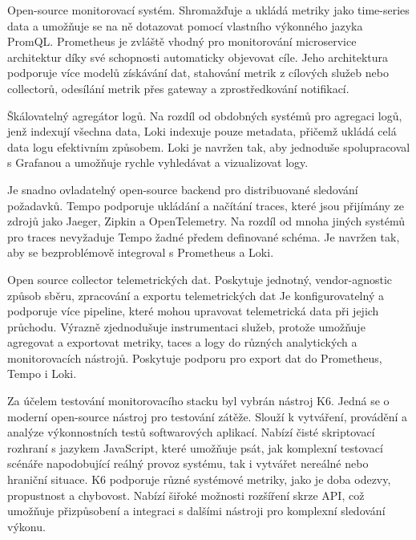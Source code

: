  
Open-source monitorovací systém. Shromažďuje a ukládá metriky jako time-series data a umožňuje se na ně dotazovat pomocí vlastního výkonného jazyka PromQL. Prometheus je zvláště vhodný pro monitorování microservice architektur díky své schopnosti automaticky objevovat cíle. Jeho architektura podporuje více modelů získávání dat, stahování metrik z cílových služeb nebo collectorů, odesílání metrik přes gateway a zprostředkování notifikací.


Škálovatelný agregátor logů. Na rozdíl od obdobných systémů pro agregaci logů, jenž indexují všechna data, Loki indexuje pouze metadata, přičemž ukládá celá data logu efektivním způsobem. Loki je navržen tak, aby jednoduše spolupracoval s Grafanou a umožňuje rychle vyhledávat a vizualizovat logy.


Je snadno ovladatelný open-source backend pro distribuované sledování požadavků. Tempo podporuje ukládání a načítání traces, které jsou přijímány ze zdrojů jako Jaeger, Zipkin a OpenTelemetry. Na rozdíl od mnoha jiných systémů pro traces nevyžaduje Tempo žadné předem definované schéma. Je navržen tak, aby se bezproblémově integroval s Prometheus a Loki.


Open source collector telemetrických dat. Poskytuje jednotný, vendor-agnostic způsob sběru, zpracování a exportu telemetrických dat  Je konfigurovatelný a podporuje více pipeline, které mohou upravovat telemetrická data při jejich průchodu. Výrazně zjednodušuje instrumentaci služeb, protože umožňuje agregovat a exportovat metriky, taces a logy do různých analytických a monitorovacích nástrojů. Poskytuje podporu pro export dat do Prometheus, Tempo i Loki.


Za účelem testování monitorovacího stacku byl vybrán nástroj K6. Jedná se o moderní open-source nástroj pro testování zátěže. Slouží k vytváření, provádění a analýze výkonnostních testů softwarových aplikací. Nabízí čisté skriptovací rozhraní s jazykem JavaScript, které umožňuje psát, jak komplexní testovací scénáře napodobující reálný provoz systému, tak i vytvářet nereálné nebo hraniční situace. K6 podporuje různé systémové metriky, jako je doba odezvy, propustnost a chybovost. Nabízí šiřoké možnosti rozšíření skrze API, což umožňuje přizpůsobení a integraci s dalšími nástroji pro komplexní sledování výkonu.

